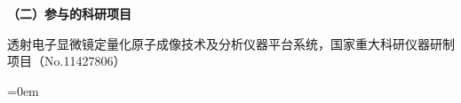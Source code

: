 \vspace*{0em}
\textbf{（二）参与的科研项目}
\begin{publist}
\item	透射电子显微镜定量化原子成像技术及分析仪器平台系统，国家重大科研仪器研制项目（No.11427806）
\end{publist}
\vfill
{}\hangindent=0em\noindent

\setlength{\parindent}{0em}

